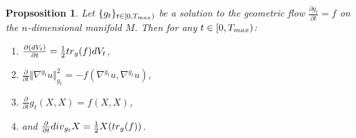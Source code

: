\documentclass{amsart}
\newtheorem{proposition}[theorem]{Propsosition}
\theoremstyle{definition}
\theoremstyle{remark}
\newcommand{\tr}{{\rm tr}}
\newcommand{\V}{{\rm V}}
\begin{document}
\begin{proposition}\label{prop:general}
    Let $\{g_t\}_{t\in [0,T_{\rm max})}$ be a solution to the geometric flow $\frac{\partial g_t}{\partial t}=f$ on the $n$-dimensional manifold $M$.  Then for any $t\in [0,T_{\rm max})$:
    \begin{enumerate}
        \item $ \frac{\partial (d\V_{t})}{ \partial t }=
        \frac{1}{2}\tr_g(f)d\V_{t}$,
        \item $
\frac{\partial}{\partial t}\Vert \nabla^{g_t}u\Vert^2_{g_t}=-f(\nabla^{g_t}u,\nabla^{g_t} u)$, 
\item $
\frac{\partial}{\partial t}g_t(X,X)=f(X,X)$,  
\item and $  \frac{\partial}{\partial t} {\rm div}_{g_t}X=\frac{1}{2}X(\tr_g(f))$.
\end{enumerate}
\end{proposition}
\end{document}
